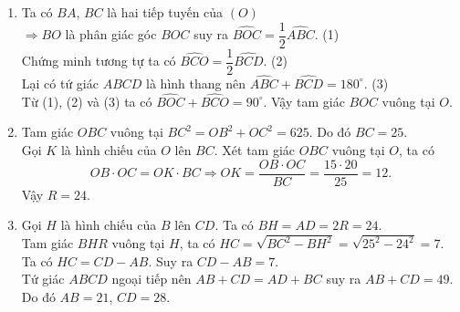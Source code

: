 \begin{bt}
{\begin{center}
	\end{center}
	\begin{enumerate}
		\item Ta có $ BA $, $ BC $ là hai tiếp tuyến của $ (O) $\\  $\Rightarrow BO $ là phân giác góc $ BOC $ suy ra $ \widehat{BOC} = \dfrac{1}{2} \widehat{ABC} $. \hfill (1)\\
		Chứng minh tương tự ta có $ \widehat{BCO} = \dfrac{1}{2}\widehat{BCD} $. \hfill (2)\\
		Lại có tứ giác $ ABCD $ là hình thang nên $ \widehat{ABC} + \widehat{BCD} = 180^\circ $. \hfill (3)\\
		Từ (1), (2) và (3) ta có $ \widehat{BOC} + \widehat{BCO} = 90^\circ$. Vậy tam giác $ BOC $ vuông tại $ O $.
		\item Tam giác $ OBC $ vuông tại $ BC^2 = OB^2 + OC^2 = 625 $. Do đó  $ BC = 25 $.\\
		Gọi $ K $ là hình chiếu của $ O $ lên $ BC $. Xét tam giác $ OBC $ vuông tại $ O $, ta có \\
		$$ OB \cdot OC = OK \cdot BC \Rightarrow OK = \dfrac{OB \cdot OC}{BC} = \dfrac{15 \cdot 20}{25} = 12. $$
		Vậy $ R = 24 $.
		\item Gọi $ H $ là hình chiếu của $ B $ lên $ CD $. Ta có $ BH = AD = 2R = 24 $.\\
		Tam giác $ BHR $ vuông tại $ H $, ta có $ HC = \sqrt{BC^2 - BH^2 } = \sqrt{ 25^2 - 24^2 } = 7$.\\
		Ta có $ HC = CD - AB $. Suy ra $ CD - AB = 7 $.\\
		Tứ giác $ ABCD $ ngoại tiếp nên $ AB + CD = AD + BC $ suy ra $ AB + CD = 49 $.
		Do đó $ AB = 21 $, $ CD =  28 $.
\end{enumerate}}
\end{bt}

